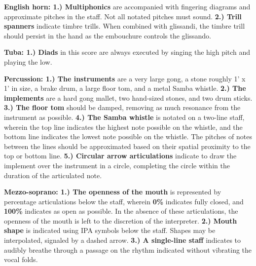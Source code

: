 \documentclass[11pt]{article}
\begin{document}
\begingroup
\textbf{English horn: 1.) Multiphonics} are accompanied with fingering diagrams and approximate pitches in the staff. Not all notated pitches must sound. \textbf{2.) Trill spanners} indicate timbre trills. When combined with glissandi, the timbre trill should persist in the hand as the embouchure controls the glissando.
\endgroup

\begingroup
\textbf{Tuba: 1.) Diads} in this score are always executed by singing the high pitch and playing the low. 
\endgroup

\begingroup
\textbf{Percussion: 1.) The instruments} are a very large gong, a stone roughly 1' x 1' in size, a brake drum, a large floor tom, and a metal Samba whistle. \textbf{2.) The implements} are a hard gong mallet, two hand-sized stones, and two drum sticks. \textbf{3.) The floor tom} should be damped, removing as much resonance from the instrument as possible. \textbf{4.) The Samba whistle} is notated on a two-line staff, wherein the top line indicates the highest note possible on the whistle, and the bottom line indicates the lowest note possible on the whistle. The pitches of notes between the lines should be approximated based on their spatial proximity to the top or bottom line. \textbf{5.) Circular arrow articulations} indicate to draw the implement over the instrument in a circle, completing the circle within the duration of the articulated note.
\endgroup

\begingroup
\textbf{Mezzo-soprano: 1.) The openness of the mouth} is represented by percentage articulations below the staff, wherein \textbf{0\%} indicates fully closed, and \textbf{100\%} indicates as open as possible. In the absence of these articulations, the openness of the mouth is left to the discretion of the interpreter. \textbf{2.) Mouth shape} is indicated using IPA symbols below the staff. Shapes may be interpolated, signaled by a dashed arrow. \textbf{3.) A single-line staff} indicates to audibly breathe through a passage on the rhythm indicated without vibrating the vocal folds.
\endgroup
\end{document}
